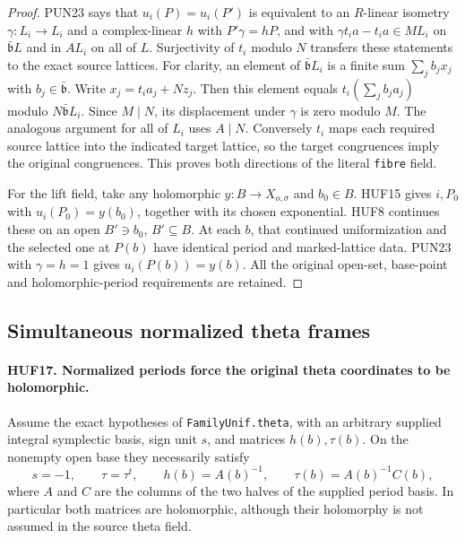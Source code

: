 \begin{proof}
PUN23 says that \(u_i(P)=u_i(P')\) is equivalent
to an \(R\)-linear isometry \(\gamma:L_i\to L_i\)
and a complex-linear \(h\) with
\(P'\gamma=hP\), and with
\(\gamma t_i a-t_i a\in ML_i\) on
\(\bar{\mathfrak b}L\) and in \(AL_i\) on
all of \(L\).
Surjectivity of \(t_i\) modulo \(N\) transfers
these statements to the exact source lattices.
For clarity, an element of
\(\bar{\mathfrak b}L_i\) is a finite sum
\(\sum_j b_jx_j\) with \(b_j\in\bar{\mathfrak b}\).
Write \(x_j=t_i a_j+N z_j\).
Then this element equals \(t_i(\sum_j b_ja_j)\)
modulo \(N\bar{\mathfrak b}L_i\).
Since \(M\mid N\), its displacement under
\(\gamma\) is zero modulo \(M\).
The analogous argument for all of \(L_i\)
uses \(A\mid N\).  Conversely \(t_i\) maps
each required source lattice into the indicated
target lattice, so the target congruences imply
the original congruences.  This proves both
directions of the literal \texttt{fibre} field.

For the lift field, take any holomorphic
\(y:B\to X_{o,\sigma}\) and \(b_0\in B\).
HUF15 gives \(i,P_0\) with \(u_i(P_0)=y(b_0)\),
together with its chosen exponential.
HUF8 continues these on an open
\(B'\ni b_0\), \(B'\subseteq B\).
At each \(b\), that continued uniformization
and the selected one at \(P(b)\) have identical
period and marked-lattice data.  PUN23 with
\(\gamma=h=1\) gives \(u_i(P(b))=y(b)\).
All the original open-set, base-point and
holomorphic-period requirements are retained.
\end{proof}

\subsection{Simultaneous normalized theta frames}

\paragraph{HUF17. Normalized periods force the original theta coordinates to be holomorphic.}
\label{claim:HUF17}
Assume the exact hypotheses of
\texttt{FamilyUnif.theta}, with an arbitrary supplied
integral symplectic basis, sign unit \(s\), and
matrices \(h(b),\tau(b)\).
On the nonempty open base they necessarily satisfy
\[
       s=-1,\qquad \tau=\tau^t,\qquad
       h(b)=A(b)^{-1},\qquad \tau(b)=A(b)^{-1}C(b),
 \tag{HUF.12}
\]
where \(A\) and \(C\) are the columns of the two
halves of the supplied period basis.
In particular both matrices are holomorphic,
although their holomorphy is not assumed in the
source theta field.

